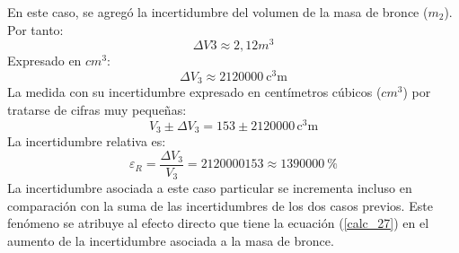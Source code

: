 \documentclass[../main.tex]{subfiles}
\begin{document}
En este caso, se agregó la incertidumbre del volumen de la masa de bronce ($m_2$). Por tanto:
\[\Delta V3\approx2,12 m^3\]
Expresado en $cm^3$:
\[\Delta V_3 \approx \qty{2120000}{\cubic\centi\metre}\]
La medida con su incertidumbre expresado en centímetros cúbicos ($cm^3$) por tratarse de cifras muy pequeñas:
\[V_3 \pm \Delta V_3 = 153 \pm 2120000 \, \unit{\cubic\centi\metre}\]
La incertidumbre relativa es:
\[\varepsilon_R = \frac{\Delta V_3}{V_3} = 2120000153 \approx \qty{1390000}{\percent}\]
La incertidumbre asociada a este caso particular se incrementa incluso en comparación con la 
suma de las incertidumbres de los dos casos previos. Este fenómeno se atribuye al efecto directo 
que tiene la ecuación (\ref{calc_27}) en el aumento de la incertidumbre asociada a la masa de bronce.
\end{document}
